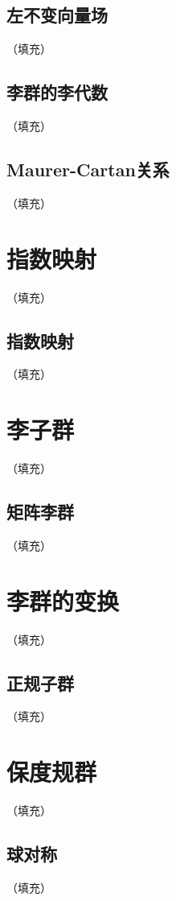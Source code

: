 \documentclass[hyperref,UTF8]{ctexbook}
\begin{document}
\subsection{左不变向量场}（填充）
\subsection{李群的李代数}（填充）
\subsection{Maurer-Cartan关系}（填充）
\section{指数映射}（填充）
\subsection{指数映射}（填充）
\section{李子群}（填充）
\subsection{矩阵李群}（填充）
\section{李群的变换}（填充）
\subsection{正规子群}（填充）
\section{保度规群}（填充）
\subsection{球对称}（填充）
\end{document}
